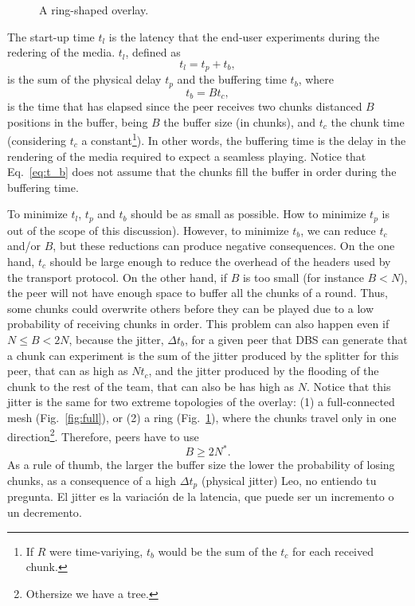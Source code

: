 

\label{sec:latency}

\begin{figure}
  \centering
  \vbox{}
  \caption{A ring-shaped overlay.}
  \label{fig:ring}
\end{figure}

The start-up time $t_l$ is the latency that the end-user experiments
during the redering of the media. $t_l$, defined as
\begin{equation}
  \label{eq:t_l}
  t_l = t_p + t_b,
\end{equation}
is the sum of the physical
delay $t_p$ and the buffering time $t_b$, where
\begin{equation}
  \label{eq:t_b}
  t_b = Bt_c,
\end{equation}
is the time that has elapsed since the peer receives two chunks
distanced $B$ positions in the buffer, being $B$ the buffer size (in
chunks), and $t_c$ the chunk time (considering $t_c$ a
constant\footnote{If $R$ were time-variying, $t_b$ would be the sum of
  the $t_c$ for each received chunk.}). In other words, the buffering
time is the delay in the rendering of the media required to expect a
seamless playing. Notice that Eq.~\ref{eq:t_b} does not assume that the
chunks fill the buffer in order during the buffering time.

To minimize $t_l$, $t_p$ and $t_b$ should be as small as possible. How
to minimize $t_p$ is out of the scope of this discussion). However, to
minimize $t_b$, we can reduce $t_c$ and/or $B$, but these reductions
can produce negative consequences. On the one hand, $t_c$ should be
large enough to reduce the overhead of the headers used by the
transport protocol. On the other hand, if $B$ is too small (for
instance $B<N$), the peer will not have enough space to buffer all the
chunks of a round. Thus, some chunks could overwrite others before
they can be played due to a low probability of receiving chunks in
order. This problem can also happen even if $N\leq B<2N$, because the
jitter, $\Delta t_b$, for a given peer that DBS can generate that a
chunk can experiment is the sum of the jitter produced by the splitter
for this peer, that can as high as $Nt_c$, and the jitter produced by the
flooding of the chunk to the rest of the team, that can also be has
high as $N$. Notice that this jitter is the same for two extreme
topologies of the overlay: (1) a full-connected mesh
(Fig.~\ref{fig:full}), or (2) a ring (Fig.~\ref{fig:ring}), where the
chunks travel only in one direction\footnote{Othersize we have a
  tree.}. Therefore, peers have to use
\begin{equation}
  \label{eq:minimum_B}
  B\ge 2N^*.
\end{equation}
As a rule of thumb, the larger the buffer size the lower the
probability of losing chunks, as a consequence of a high $\Delta t_p$
(physical jitter)  {\color{red}
  Leo, no entiendo tu pregunta. El jitter es la variación de la
  latencia, que puede ser un incremento o un decremento}.

